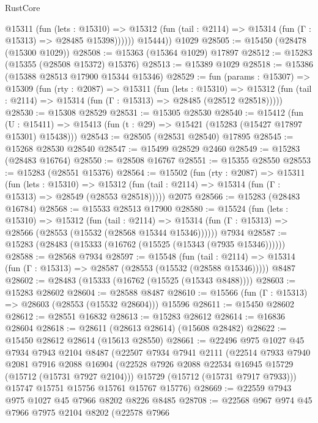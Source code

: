 \begin{lexlean}{RustCore}
\begin{coremodule}
            @15311
              (fun (lets : @15310) =>
              @15312 (fun (tail : @2114) => @15314 (fun (Γ : @15313) => @28485 @15398))))))
        @15444))
    @1029
@28505 := @15450 (@28478 (@15300 @1029))
@28508 := @15363 (@15364 @1029) @17897
@28512 := @15283 (@15355 (@28508 @15372) @15376)
@28513 := @15389 @1029
@28518 := @15386 (@15388 @28513 @17900 @15344 @15346)
@28529 := fun (params : @15307) =>
  @15309
    (fun (rty : @2087) =>
    @15311
      (fun (lets : @15310) =>
      @15312 (fun (tail : @2114) => @15314 (fun (Γ : @15313) => @28485 (@28512 @28518)))))
@28530 := @15308 @28529
@28531 := @15305 @28530
@28540 := @15412
    (fun (U : @15411) => @15413 (fun (t : @29) => @15421 (@15283 (@15427 @17897 @15301) @15438)))
@28543 := @28505 (@28531 @28540) @17895
@28545 := @15268 @28530 @28540
@28547 := @15499 @28529 @2460
@28549 := @15283 (@28483 @16764)
@28550 := @28508 @16767
@28551 := @15355 @28550
@28553 := @15283 (@28551 @15376)
@28564 := @15502
    (fun (rty : @2087) =>
    @15311
      (fun (lets : @15310) =>
      @15312 (fun (tail : @2114) => @15314 (fun (Γ : @15313) => @28549 (@28553 @28518)))))
    @2075
@28566 := @15283 (@28483 @16784)
@28568 := @15533 @28513 @17900
@28580 := @15524
    (fun (lets : @15310) =>
    @15312
      (fun (tail : @2114) =>
      @15314 (fun (Γ : @15313) => @28566 (@28553 (@15532 (@28568 @15344 @15346))))))
    @7934
@28587 := @15283 (@28483 (@15333 (@16762 (@15525 (@15343 (@7935 @15346))))))
@28588 := @28568 @7934
@28597 := @15548
    (fun (tail : @2114) => @15314 (fun (Γ : @15313) => @28587 (@28553 (@15532 (@28588 @15346)))))
    @8487
@28602 := @28483 (@15333 (@16762 (@15525 (@15343 @8488))))
@28603 := @15283 @28602
@28604 := @28588 @8487
@28610 := @15566 (fun (Γ : @15313) => @28603 (@28553 (@15532 @28604))) @15596
@28611 := @15450 @28602
@28612 := @28551 @16832
@28613 := @15283 @28612
@28614 := @16836 @28604
@28618 := @28611 (@28613 @28614) (@15608 @28482)
@28622 := @15450 @28612 @28614 (@15613 @28550)
@28661 := @22496
    @975
    @1027
    @45
    @7934
    @7943
    @2104
    @8487
    (@22507
      @7934
      @7941
      @2111
      (@22514
        @7933
        @7940
        @2081
        @7916
        @2088
        @16904
        (@22528 @7926 @2088 @22534 @16945 @15729 (@15712 (@15731 @7927 @2104)))
        @15729
        (@15712 (@15731 @7917 @7933)))
      @15747
      @15751
      @15756
      @15761
      @15767
      @15776)
@28669 := @22559 @7943 @975 @1027 @45 @7966 @8202 @8226 @8485
@28708 := @22568
    @967
    @974
    @45
    @7966
    @7975
    @2104
    @8202
    (@22578
      @7966

\end{coremodule}
\end{lexlean}
